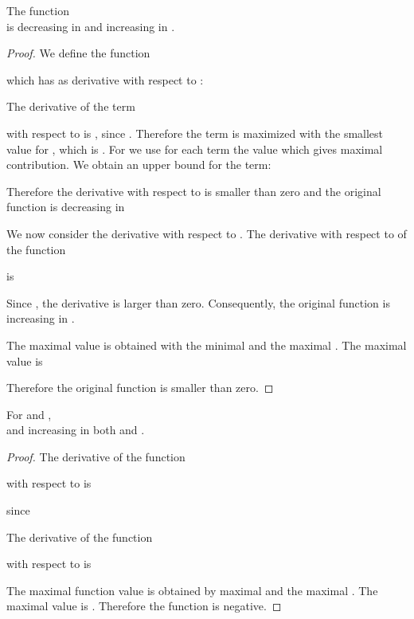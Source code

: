 \documentclass{article}
\begin{document}
\begin{lemma}[Function ]
\label{lem:F4}

The function \\
 
is decreasing in  and increasing in .
\end{lemma}
\begin{proof}
We define the function

which has as derivative with respect to :

The derivative of the term

with respect to  is 
, since
.
Therefore the term is maximized with the smallest value for , which
is .
For  we use for each term the value which gives maximal
contribution. We obtain an upper bound for the term:

Therefore the derivative with respect to  
is smaller than zero and the original function is decreasing in 

We now consider the derivative with respect to .
The derivative with respect to  of the function

is

Since 
, the derivative is larger than zero.
Consequently, the original function is increasing in  .

The maximal value is obtained with the minimal  and the maximal  .
The maximal value is

Therefore the original function is smaller than zero.
\end{proof}



\begin{lemma}[Function ]
\label{lem:F5}

For  and , \\

and increasing in both  and .

\end{lemma}
\begin{proof}
The derivative of the function

with respect to  is

since


The derivative of the function

with respect to  is


The maximal function value is obtained by maximal  and the maximal  . 
The maximal value is
.
Therefore the function is negative.
\end{proof}
\end{document}
